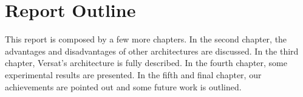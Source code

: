 \section{Report Outline}
\label{section:outline}

This report is composed by a few more chapters. In the second chapter,
the advantages and disadvantages of other architectures are
discussed. In the third chapter, Versat's architecture is fully
described. In the fourth chapter, some experimental results are
presented. In the fifth and final chapter, our achievements are
pointed out and some future work is outlined.


